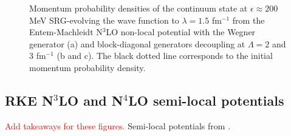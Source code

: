 \documentclass[preprintnumbers,floatfix,aps,prc,preprint,nofootinbib]{revtex4-1}
\begin{document}
\begin{figure}[H]
	\centering
	\quad
	\quad
	\caption{Momentum probability densities of the continuum state at $\epsilon \approx 200$ MeV SRG-evolving the wave function to $\lambda=1.5$ fm$^{-1}$ from the Entem-Machleidt N$^3$LO non-local potential with the Wegner generator (a) and block-diagonal generators decoupling at $\Lambda=2$ and $3$ fm$^{-1}$ (b and c). The black dotted line corresponds to the initial momentum probability density.}
	\label{continuum_state_momentum_distribution_eps200,0_kvnn10}
\end{figure}


\subsection{RKE N$^3$LO and N$^4$LO semi-local potentials}
\label{sec:semilocal_results}


\textcolor{red}{Add takeaways for these figures.} Semi-local potentials from \cite{Reinert:2017usi}.
\end{document}
